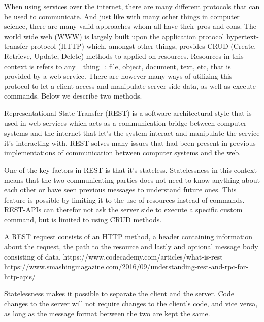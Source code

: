 \documentclass[11pt]{article}
\begin{document}
\begin{multicols}{2}

        When using services over the internet, there are many different protocols that can be used to communicate.
        And just like with many other things in computer science, there are many valid approaches whom all have their
        pros and cons. The world wide web (WWW) is largely built upon the application protocol
        hypertext-transfer-protocol (HTTP) which, amongst other things, provides CRUD (Create, Retrieve, Update, Delete)
        methods to applied on resources. Resources in this context is refers to any _thing_: file, object, document,
        text, etc, that is provided by a web service. There are however many ways of utilizing this protocol to let a
        client access and manipulate server-side data, as well as execute commands. Below we describe two methods.


        Representational State Transfer (REST) is a software architectural style
        that is used in web services which acts as a communication bridge
        between computer systems and the internet that let's the system interact
        and manipulate the service it's interacting with. REST solves many
        issues that had been present in previous implementations of
        communication between computer systems and the web.

        One of the key factors in REST is that it's stateless. Statelessness in
        this context means that the two communicating parties does not need to
        know anything about each other or have seen previous messages to
        understand future ones. This feature is possible by limiting it to the
        use of resources instead of commands. REST-APIs can therefor not ask the
        server side to execute a specific custom command, but is limited to
        using CRUD methods.

        A REST request consists of an HTTP method, a header containing
        information about the request, the path to the resource and lastly and
        optional message body consisting of data.
        https://www.codecademy.com/articles/what-is-rest
        https://www.smashingmagazine.com/2016/09/understanding-rest-and-rpc-for-http-apis/

        Statelessness makes it possible to separate the client and the server.
        Code changes to the server will not require changes to the client's
        code, and vice versa, as long as the message format between the two are
        kept the same.


\end{multicols}
\end{document}

